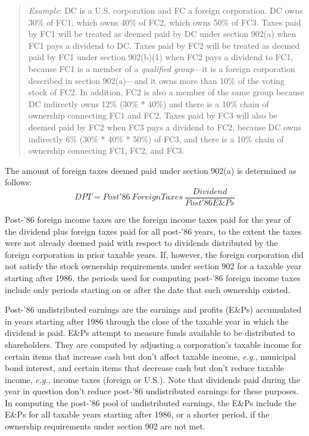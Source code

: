 \begin{quote}
\emph{Example}: DC is a U.S. corporation and FC a foreign corporation.  DC owns 30\% of FC1, which owns 40\% of FC2, which owns 50\% of FC3.  Taxes paid by FC1 will be treated as deemed paid by DC under section 902(a) when FC1 pays a dividend to DC.  Taxes paid by FC2 will be treated as deemed paid by FC1 under section 902(b)(1) when FC2 pays a dividend to FC1, because FC1 is a member of a \emph{qualified group}---it is a foreign corporation described in section 902(a)---and it owns more than 10\% of the voting stock of FC2.  In addition, FC2 is also a member of the same group because DC indirectly owns 12\% (30\% * 40\%) and there is a 10\% chain of ownership connecting FC1 and FC2.  Taxes paid by FC3 will also be deemed paid by FC2 when FC3 pays a dividend to FC2, because DC owns indirectly 6\% (30\% * 40\% * 50\%) of FC3, and there is a 10\% chain of ownership connecting FC1, FC2, and FC3.
\end{quote}

The amount of foreign taxes deemed paid under section 902(a) is determined as follows:  \
	\begin{displaymath}
		DPT =  Post '86 \ Foreign Taxes\  \frac{Dividend}{Post '86 E\&Ps}
	\end{displaymath}

Post-'86 foreign income taxes are the foreign income taxes paid for the year of the dividend plus foreign taxes paid for all post-'86 years, to the extent the taxes were not already deemed paid with respect to dividends distributed by the foreign corporation in prior taxable years.  If, however, the foreign corporation did not satisfy the stock ownership requirements under section 902 for a taxable year starting after 1986, the periods used for computing post-'86 foreign income taxes include only periods starting on or after the date that such ownership existed.

Post-'86 undistributed earnings are the earnings and profits (E\&Ps) accumulated in years starting after 1986 through the close of the taxable year in which the dividend is paid.  E\&Ps attempt to measure funds available to be distributed to shareholders.  They are computed by adjusting a corporation's taxable income for certain items that increase cash but don't affect taxable income, \emph{e.g.}, municipal bond interest, and certain items that decrease cash but don't reduce taxable income, \emph{e.g.}, income taxes (foreign or U.S.).  Note that dividends paid during the year in question don't reduce post-'86 undistributed earnings for these purposes.  In computing the post-'86 pool of undistributed earnings, the E\&Ps include the E\&Ps for all taxable years starting after 1986, or a shorter period, if the ownership requirements under section 902 are not met.

